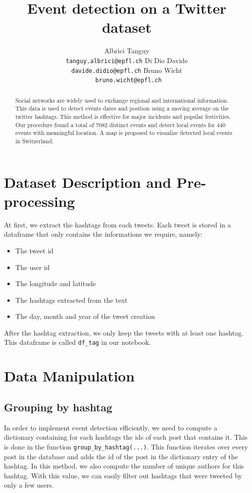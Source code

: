 \documentclass[11pt]{article}
\title{Event detection on a Twitter dataset}
\author{ 
  Albrici Tanguy \hspace{40px} \\
  {\tt tanguy.albrici@epfl.ch} \hspace{40px} \And
  Di Dio Davide \\
  {\tt davide.didio@epfl.ch} \And
   \hspace{40px} Bruno Wicht \\
{\tt \hspace{40px} bruno.wicht@epfl.ch} \\}
\date{}
\begin{document}
\maketitle
\begin{abstract}
  Social networks are widely used to exchange regional and international information. This data is used to detect events dates and position using a moving average on the twitter hashtags. This method is effective for major incidents and popular festivities. Our  procedure found a total of 7082 distinct events and detect local events for 440 events with meaningful location. A map is proposed to visualize detected local events in Switzerland.
\end{abstract}


\section{Dataset Description and Pre-processing}

At first, we extract the hashtags from each tweets. Each tweet is stored in a dataframe that only contains the informations we require, namely: 
\begin{itemize}

\item The tweet id 
\item The user id
\item The longitude and latitude
\item The hashtags extracted from the text
\item The day, month and year of the tweet creation

\end{itemize}

After the hashtag extraction, we only keep the tweets with at least one hashtag. This dataframe is called \texttt{df\_tag} in our notebook.

\section{Data Manipulation}


\subsection{Grouping by hashtag}

In order to implement event detection efficiently, we need to compute a dictionary containing for each hashtags the ids of each post that contains it. This is done in the function \texttt{group\_by\_hashtag(...)}. This function iterates over every post in the database and adds the id of the post in the dictionary entry of the hashtag. In this method, we also compute the number of unique authors for this hashtag. With this value, we can easily filter out hashtags that were tweeted by only a few users.
\end{document}
